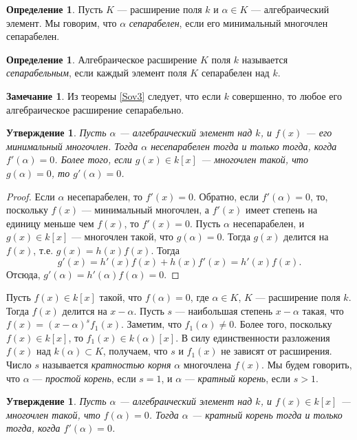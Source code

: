 \documentclass[12pt, titlepage, oneside]{amsbook}
\newtheorem{claim}[theorem]{Утверждение}
\theoremstyle{definition}
\newtheorem{definition}[theorem]{Определение}
\newtheorem{remark}[theorem]{Замечание}
\theoremstyle{remark}
\begin{document}
\begin{definition}
Пусть $K$ --- расширение поля $k$ и $\alpha\in K$ --- алгебраический элемент. Мы говорим, что $\alpha$ \emph{сепарабелен}, если его минимальный многочлен сепарабелен.
\end{definition}


\begin{definition}
Алгебраическое расширение $K$ поля $k$ называется \emph{сепарабельным}, если каждый элемент поля $K$ сепарабелен над $k$.
\end{definition}

\begin{remark}
Из теоремы \ref{Sov3} следует, что если $k$ совершенно, то любое его алгебраическое расширение сепарабельно.
\end{remark}

\begin{claim}
\label{Sep1}
Пусть $\alpha$ --- алгебраический элемент над $k$, и $f(x)$ --- его минимальный многочлен. Тогда $\alpha$ несепарабелен тогда и только тогда, когда $f'(\alpha)=0$. Более того, если $g(x)\in k[x]$ --- многочлен такой, что $g(\alpha)=0$, то $g'(\alpha)=0$.
\end{claim}

\begin{proof}
Если $\alpha$ несепарабелен, то $f'(x)=0$. Обратно, если $f'(\alpha)=0$, то, поскольку $f(x)$ --- минимальный многочлен, а $f'(x)$ имеет степень на единицу меньше чем $f(x)$, то $f'(x)=0$. Пусть $\alpha$ несепарабелен, и $g(x)\in k[x]$ --- многочлен такой, что $g(\alpha)=0$. Тогда $g(x)$ делится на $f(x)$, т.е. $g(x)=h(x)f(x)$. Тогда $$g'(x)=h'(x)f(x)+h(x)f'(x)=h'(x)f(x).$$ Отсюда, $g'(\alpha)=h'(\alpha)f(\alpha)=0$.
\end{proof}

Пусть $f(x)\in k[x]$ такой, что $f(\alpha)=0$, где $\alpha\in K$, $K$ --- расширение поля $k$. Тогда $f(x)$ делится на $x-\alpha$. Пусть $s$ --- наибольшая степень $x-\alpha$ такая, что $f(x)=(x-\alpha)^sf_1(x)$. Заметим, что $f_1(\alpha)\neq 0$. Более того, поскольку $f(x)\in k[x]$, то $f_1(x)\in k(\alpha)[x]$. В силу единственности разложения $f(x)$ над $k(\alpha)\subset K$, получаем, что  $s$ и $f_1(x)$ не зависят от расширения. Число $s$ называется \emph{кратностью корня} $\alpha$ многочлена $f(x)$. Мы будем говорить, что $\alpha$ --- \emph{простой корень}, если $s=1$, и $\alpha$ --- \emph{кратный корень}, если $s>1$.

\begin{claim}
\label{Sep2}
Пусть $\alpha$ --- алгебраический элемент над $k$, и $f(x)\in k[x]$ --- многочлен такой, что $f(\alpha)=0$. Тогда $\alpha$ --- \emph{кратный корень} тогда и только тогда, когда $f'(\alpha)=0$.
\end{claim}
\end{document}

